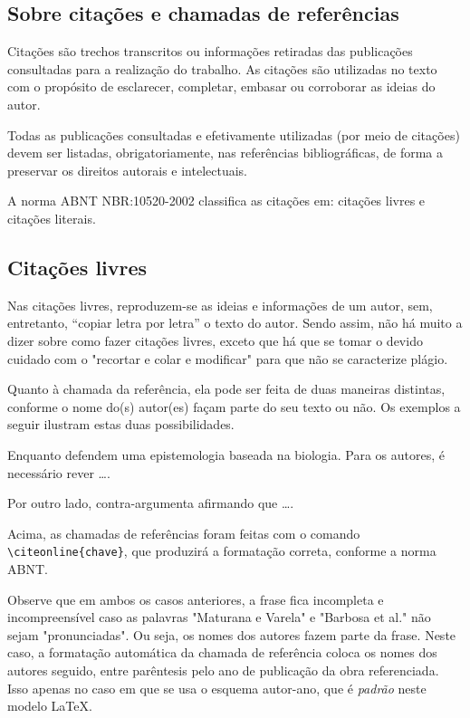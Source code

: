 \begin{apendicesenv}
\chapter{Sobre citações e chamadas de referências}
\label{chap:apSobreCita}


Citações são trechos transcritos ou informações retiradas das publicações consultadas para a realização do trabalho.
As citações são utilizadas no texto com o propósito de esclarecer, completar, embasar ou corroborar as ideias do autor.

Todas as publicações consultadas e efetivamente utilizadas (por meio de citações) devem ser listadas, obrigatoriamente, nas referências bibliográficas, de forma a preservar os direitos autorais e intelectuais.

A norma ABNT NBR:10520-2002 classifica as citações em: citações livres e citações literais.



\section{Citações livres}
\label{sec:citacoesLivres}


Nas citações livres, reproduzem-se as ideias e informações de um autor, sem, entretanto, ``copiar letra por letra'' o texto do autor. Sendo assim, não há muito a dizer sobre como fazer citações livres, exceto que há que se tomar o devido cuidado com o "recortar e colar e modificar"{} para que não se caracterize plágio.

Quanto à chamada da referência, ela pode ser feita de duas maneiras distintas, conforme o nome do(s) autor(es) façam parte do seu texto ou não. Os exemplos a seguir ilustram estas duas possibilidades.

Enquanto  defendem uma epistemologia baseada na biologia. Para os autores, é necessário rever \ldots.

Por outro lado,  contra-argumenta afirmando que \ldots.

Acima, as chamadas de referências foram feitas com o comando \verb|\citeonline{chave}|, que produzirá a formatação correta, conforme a norma ABNT.

 Observe que em ambos os casos anteriores, a frase fica incompleta e incompreensível caso as palavras "Maturana e Varela"{} e "Barbosa et al."{} não sejam "pronunciadas"{}. Ou seja, os nomes dos autores fazem parte da frase. Neste caso, a formatação automática da chamada de referência coloca os nomes dos autores seguido, entre parêntesis pelo ano de publicação da obra referenciada. Isso apenas no caso em que se usa o esquema autor-ano, que é \textit{padrão} neste modelo \LaTeX{}.


\end{apendicesenv}
